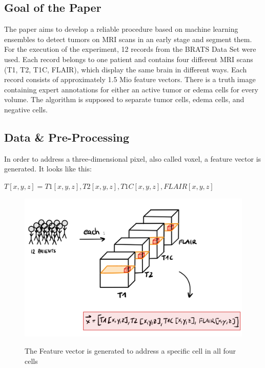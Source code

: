 \documentclass[
12pt,
headsepline,
bibliography=totoc,
twoside=semi,
fleqn
]{scrartcl}
\begin{document}
 \subsection{Goal of the Paper\label{sec:sec3-1}}
 The paper aims to develop a reliable procedure based on machine learning ensembles to detect tumors on MRI scans in an early stage and segment them. For the execution of the experiment, 12 records from the BRATS Data Set were used. Each record belongs to one patient and contains four different MRI scans (T1, T2, T1C, FLAIR), which display the same brain in different ways. Each record consists of approximately 1.5 Mio feature vectors. There is a truth image containing expert annotations for either an active tumor or edema cells for every volume. The algorithm is supposed to separate tumor cells, edema cells, and negative cells.

 \subsection{Data \& Pre-Processing\label{sec:sec3-2}}
 In order to address a three-dimensional pixel, also called voxel, a feature vector is generated. It looks like this:\\
 
 \begin{center} $T[x,y,z] = T1[x,y,z], T2[x,y,z], T1C[x,y,z], FLAIR[x,y,z]$\end{center}

 \begin{figure}[H]
 \centering \includegraphics[scale=0.7]{BDT14.png}\label{fig:fig14}
 \caption{The Feature vector is generated to address a specific cell in all four cells}
 \end{figure}
\end{document}

